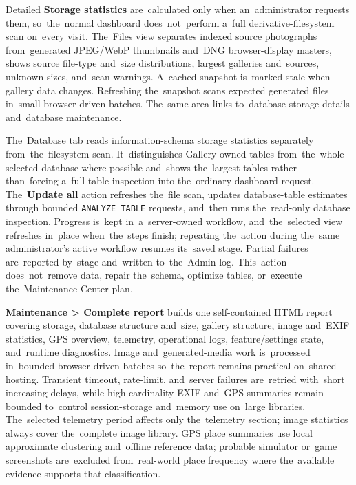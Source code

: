 \documentclass[11pt,a4paper]{article}
\newcommand{\ui}[1]{\textbf{#1}}
\newcommand{\codeword}[1]{\nolinkurl{#1}}
\begin{document}

Detailed \ui{Storage statistics} are~calculated only when an~administrator
requests them, so~the~normal dashboard does~not~perform a~full
derivative-filesystem scan on~every visit. The~Files view separates indexed
source photographs from~generated JPEG/WebP thumbnails and~DNG browser-display
masters, shows source file-type and~size distributions, largest galleries
and~sources, unknown sizes, and~scan warnings. A~cached snapshot is~marked stale
when gallery data changes. Refreshing the~snapshot scans expected generated
files in~small browser-driven batches. The~same area links to~database storage
details and~database maintenance.

The~Database tab reads information-schema storage statistics separately
from~the~filesystem scan. It~distinguishes Gallery-owned tables from~the~whole
selected database where possible and~shows the~largest tables rather
than~forcing a~full table inspection into the~ordinary dashboard request.
The~\ui{Update all} action refreshes the~file scan, updates database-table
estimates through bounded \codeword{ANALYZE TABLE} requests, and~then runs
the~read-only database inspection. Progress is~kept in~a~server-owned workflow,
and~the~selected view refreshes in~place when~the~steps finish; repeating
the~action during the~same administrator's active workflow resumes its~saved
stage. Partial failures are~reported by~stage and~written to~the~Admin log.
This~action does~not~remove data, repair the~schema, optimize tables, or~execute
the~Maintenance Center plan.

\ui{Maintenance > Complete report} builds one self-contained HTML report
covering storage, database structure and~size, gallery structure, image and~EXIF
statistics, GPS overview, telemetry, operational logs, feature/settings state,
and~runtime diagnostics. Image and~generated-media work is~processed in~bounded
browser-driven batches so~the~report remains practical on~shared hosting.
Transient timeout, rate-limit, and~server failures are~retried with~short
increasing delays, while high-cardinality EXIF and~GPS summaries remain bounded
to~control session-storage and~memory use on~large libraries. The~selected
telemetry period affects only the~telemetry section; image statistics always
cover the~complete image library. GPS place summaries use local approximate
clustering and~offline reference data; probable simulator or~game screenshots
are~excluded from~real-world place frequency where the~available evidence
supports that classification.
\end{document}
